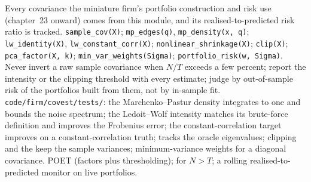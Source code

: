 \begin{build}
 Every covariance the miniature firm's portfolio construction and risk use (chapter~23 onward) comes from this module, and its realised-to-predicted risk ratio is
tracked.
 \texttt{sample\_cov(X)}; \texttt{mp\_edges(q)}, \texttt{mp\_density(x, q)}; \texttt{lw\_identity(X)}, \texttt{lw\_constant\_corr(X)}; \texttt{nonlinear\_shrinkage(X)};
\texttt{clip(X)}; \texttt{pca\_factor(X, k)}; \texttt{min\_var\_weights(Sigma)}; \texttt{portfolio\_risk(w, Sigma)}.
 Never invert a raw sample covariance when $N/T$ exceeds a few percent; report the intensity or the clipping threshold with every estimate; judge  by out-of-sample
risk of the portfolios built from them, not by in-sample fit.
 \texttt{code/firm/covest/tests/}: the Marchenko--Pastur density integrates to one and bounds the noise spectrum; the Ledoit--Wolf intensity matches its brute-force
definition and improves the Frobenius error; the constant-correlation target improves on a constant-correlation truth;  tracks the oracle eigenvalues; clipping and the
 keep the sample variances; minimum-variance weights for a diagonal covariance.
 POET (factors plus thresholding);  for $N > T$; a rolling realised-to-predicted monitor on live portfolios.
\end{build}

